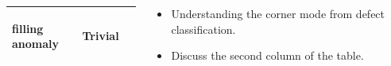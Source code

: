\documentclass{beamer}
\renewcommand{\(}{\left(}
\renewcommand{\)}{\right)}
\renewcommand{\[}{\left[}
\renewcommand{\]}{\right]}
\begin{document}
\begin{frame}
\begin{columns}
\begin{column}{0.5\textwidth}
\begin{table}
\begin{adjustbox}{width=\columnwidth,center}
\begin{tabular}{|| p{2.5cm}| p{2.5cm} | p{2.5cm}||}
\begin{center}
                        filling anomaly
                        \end{center}
                        & 
                        \begin{center}
                        Trivial
                        \end{center}
                            \\ 
                        \hline
                        \end{tabular}
                \end{adjustbox}
            \end{table}
        \end{column}
        \begin{column}{0.5\textwidth}
            \begin{itemize}
                \item Understanding the corner mode from defect classification.
                \item Discuss the second column of the table. 
            \end{itemize}
        \end{column}
    \end{columns}

\end{frame}
\end{document}
